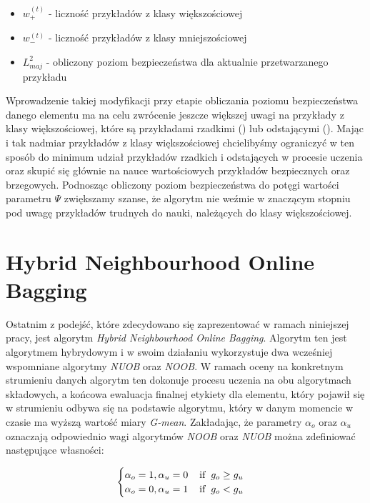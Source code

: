\begin{itemize}
    \item $w^{(t)}_{+}$ - liczność przykładów z klasy większościowej
    \item $w^{(t)}_{-}$ - liczność przykładów z klasy mniejszościowej
    \item $L^2_{maj}$ - obliczony poziom bezpieczeństwa dla aktualnie przetwarzanego przykładu
\end{itemize}

\noindent Wprowadzenie takiej modyfikacji przy etapie obliczania poziomu bezpieczeństwa danego elementu ma na celu zwrócenie jeszcze większej uwagi na przykłady z klasy większościowej, które są przykładami rzadkimi () lub odstającymi (). Mając i tak nadmiar przykładów z klasy większościowej chcielibyśmy ograniczyć w ten sposób do minimum udział przykładów rzadkich i odstających w procesie uczenia oraz skupić się głównie na nauce wartościowych przykładów bezpiecznych oraz brzegowych. Podnosząc obliczony poziom bezpieczeństwa do potęgi wartości parametru $\Psi$ zwiększamy szanse, że algorytm nie weźmie w znaczącym stopniu pod uwagę przykładów trudnych do nauki, należących do klasy większościowej.

\newpage

\section{Hybrid Neighbourhood Online Bagging}

\noindent Ostatnim z podejść, które zdecydowano się zaprezentować w ramach niniejszej pracy, jest algorytm \textit{Hybrid Neighbourhood Online Bagging}. Algorytm ten jest algorytmem hybrydowym i w swoim działaniu wykorzystuje dwa wcześniej wspomniane algorytmy \textit{NUOB} oraz \textit{NOOB}. W ramach oceny na konkretnym strumieniu danych algorytm ten dokonuje procesu uczenia na obu algorytmach składowych, a końcowa ewaluacja finalnej etykiety dla elementu, który pojawił się w strumieniu odbywa się na podstawie algorytmu, który w danym momencie w czasie ma wyższą wartość miary \textit{G-mean}. Zakładając, że parametry $\alpha_o$ oraz $\alpha_u$ oznaczają odpowiednio wagi algorytmów \textit{NOOB} oraz \textit{NUOB} można zdefiniować następujące własności:

\begin{equation}
    \begin{cases}
    \alpha_o = 1, \alpha_u = 0 \hspace{4mm} \textrm{if} \hspace{2mm} g_o \geq g_u\\
    \alpha_o = 0, \alpha_u = 1 \hspace{4mm} \textrm{if} \hspace{2mm} g_o < g_u
    \end{cases}
\end{equation}


